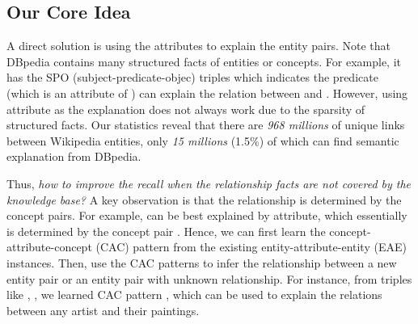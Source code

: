 \subsection{Our Core Idea}
A direct solution is using the attributes to explain the entity pairs.
Note that DBpedia contains many structured facts of entities or concepts.
For example, it has the SPO (subject-predicate-objec) triples  which indicates the predicate  (which is an attribute of ) can explain the relation between  and .
However, using attribute as the explanation does not always work due to the sparsity of structured facts.
Our statistics reveal that there are \emph{968 millions} of unique links between Wikipedia entities, only \emph{15 millions} (1.5\%) of which can find semantic explanation from DBpedia.


Thus, {\it how to improve the recall when the relationship facts are not covered by the knowledge base?}
A key observation is that the relationship is determined by the concept pairs. For example,  can be best explained by  attribute, which essentially is determined by the concept pair . Hence, we can first learn the concept-attribute-concept (CAC) pattern from the existing entity-attribute-entity (EAE) instances. Then, use the CAC patterns to infer the relationship between a new entity pair or an entity pair with unknown relationship.
For instance, from triples like , , we learned CAC pattern , which can be used to explain the  relations between any artist and their paintings.

